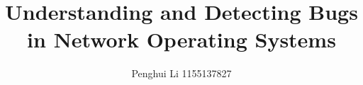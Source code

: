\title[]{Understanding and Detecting Bugs in Network Operating Systems}

\author{Penghui Li 1155137827}
